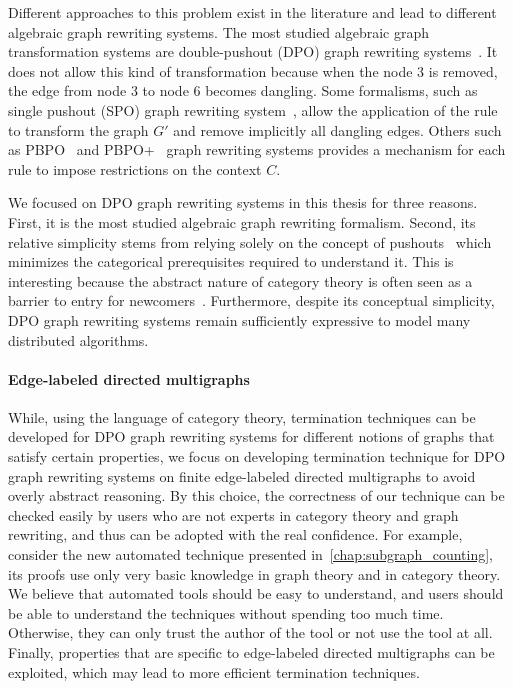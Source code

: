Different approaches to this problem exist in the literature and lead to different algebraic graph rewriting systems.   
The most studied algebraic graph transformation systems are double-pushout (DPO) graph rewriting systems~\cite{corradini1997algebraic}. It does not allow this kind of transformation because when the node 3 is removed, the edge from node 3 to node 6 becomes dangling. Some formalisms, such as single pushout (SPO) graph rewriting system~\cite{ehrig1997algebraic}, allow the application of the rule to transform the graph $G'$ and remove implicitly all dangling edges. Others such as PBPO~\cite{corradini2019thepbpo} and PBPO+~\cite{overbeek2023graph} graph rewriting systems provides a mechanism for each rule to impose restrictions on the context $C$. 

   We focused on DPO graph rewriting systems in this thesis for three reasons. First, it is the most studied algebraic graph rewriting formalism. 
   Second, its relative simplicity stems from relying solely on the concept of pushouts~\cite{pierce1991basic} which minimizes the categorical prerequisites required to understand it. This is interesting because the abstract nature of category theory is often seen as a barrier to entry for newcomers~\cite{overbeekthesis}.
    Furthermore, despite its conceptual simplicity, DPO graph rewriting systems remain sufficiently expressive to model many distributed algorithms.



\paragraph{Edge-labeled directed multigraphs}
 While, using the language of category theory, termination techniques can be developed for DPO graph rewriting systems for different notions of graphs that satisfy certain properties, we focus on developing termination technique for DPO graph rewriting systems on finite edge-labeled directed multigraphs to avoid overly abstract reasoning.
 By this choice, the correctness of our technique can be checked easily by users who are not experts in category theory and graph rewriting, and thus can be adopted with the real confidence. For example, consider the new automated technique presented in~\autoref{chap:subgraph_counting}, its proofs use only very basic knowledge in graph theory and in category theory. We believe that automated tools should be easy to understand, and users should be able to understand the techniques without spending too much time. Otherwise, they can only trust the author of the tool or not use the tool at all.
 Finally, properties that are specific to edge-labeled directed multigraphs can be exploited, which may lead to more efficient termination techniques. 

